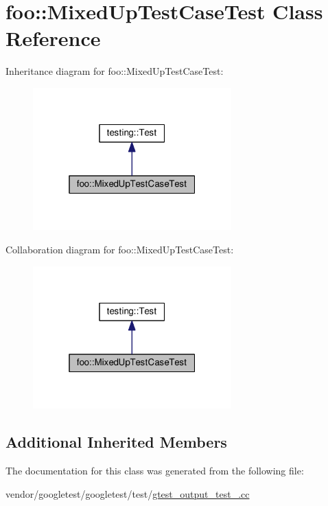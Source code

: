 \hypertarget{classfoo_1_1MixedUpTestCaseTest}{}\section{foo\+:\+:Mixed\+Up\+Test\+Case\+Test Class Reference}
\label{classfoo_1_1MixedUpTestCaseTest}


Inheritance diagram for foo\+:\+:Mixed\+Up\+Test\+Case\+Test\+:\nopagebreak
\begin{figure}[H]
\begin{center}
\leavevmode
\includegraphics[width=217pt]{classfoo_1_1MixedUpTestCaseTest__inherit__graph}
\end{center}
\end{figure}


Collaboration diagram for foo\+:\+:Mixed\+Up\+Test\+Case\+Test\+:\nopagebreak
\begin{figure}[H]
\begin{center}
\leavevmode
\includegraphics[width=217pt]{classfoo_1_1MixedUpTestCaseTest__coll__graph}
\end{center}
\end{figure}
\subsection*{Additional Inherited Members}


The documentation for this class was generated from the following file\+:\begin{DoxyCompactItemize}
\item 
vendor/googletest/googletest/test/\hyperlink{gtest__output__test___8cc}{gtest\+\_\+output\+\_\+test\+\_\+.\+cc}\end{DoxyCompactItemize}
